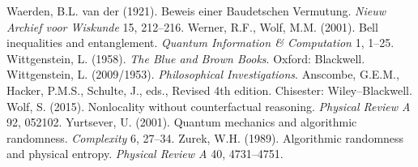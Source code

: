 \documentclass[11pt,a4paper]{article}
\numberwithin{equation}{section}
\begin{document}
\begin{small}
\begin{thebibliography}{99}
Waerden, B.L.  van der  (1921). Beweis einer Baudetschen
Vermutung. \emph{Nieuw Archief voor Wiskunde} 15, 212--216.
 \bibitem{}
 Werner, R.F., Wolf, M.M. (2001). Bell inequalities and entanglement. 
 \emph{Quantum Information \& Computation} 1, 1--25. 
 \bibitem{} Wittgenstein, L. (1958). \emph{The Blue and Brown Books}. Oxford:  Blackwell. 
 \bibitem{} Wittgenstein, L. (2009/1953). \emph{Philosophical Investigations}.  Anscombe, G.E.M., Hacker, P.M.S., Schulte, J., eds., Revised 4th edition. Chisester: Wiley--Blackwell. 
  \bibitem{} Wolf, S. (2015). Nonlocality without counterfactual reasoning. \emph{Physical Review A}  92, 052102.
 \bibitem{} Yurtsever, U. (2001). Quantum mechanics and algorithmic randomness. \emph{Complexity} 6, 27--34.
 \bibitem{}  Zurek, W.H. (1989). Algorithmic randomness and physical entropy. \emph{Physical Review A} 40, 4731--4751. 
\end{thebibliography}
\end{small}
\end{document}

